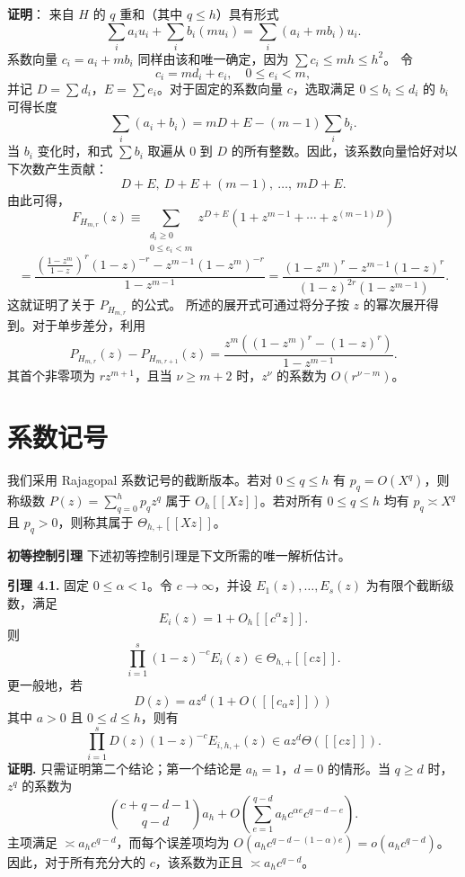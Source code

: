 \documentclass[11pt]{article}
\theoremstyle{break}
\begin{document}
\textbf{证明}：
来自 $H$ 的 $q$ 重和（其中 $q \leq h$）具有形式
\[ \sum_i a_i u_i + \sum_i b_i (m u_i) = \sum_i (a_i + m b_i) u_i. \]
系数向量 $c_i = a_i + m b_i$ 同样由该和唯一确定，因为 $\sum c_i \leq mh \leq h^2$。
令
\[ c_i = m d_i + e_i, \quad 0 \leq e_i < m, \]
并记 $D = \sum d_i$，$E = \sum e_i$。对于固定的系数向量 $c$，选取满足 $0 \leq b_i \leq d_i$ 的 $b_i$ 可得长度
\[ \sum_i (a_i + b_i) = mD + E - (m-1) \sum_i b_i. \]
当 $b_i$ 变化时，和式 $\sum b_i$ 取遍从 $0$ 到 $D$ 的所有整数。因此，该系数向量恰好对以下次数产生贡献：
\[ D+E, \ D+E+(m-1), \ \dots, \ mD+E. \]
由此可得，
\[ F_{H_{m,r}}(z) \equiv \sum_{\substack{d_i \geq 0 \\ 0 \leq e_i < m}} z^{D+E} \left( 1 + z^{m-1} + \cdots + z^{(m-1)D} \right) \]
\[ = \frac{ \left( \frac{1-z^m}{1-z} \right)^r (1-z)^{-r} - z^{m-1}(1-z^m)^{-r} }{ 1-z^{m-1} } = \frac{ (1-z^m)^r - z^{m-1}(1-z)^r }{ (1-z)^{2r}(1-z^{m-1}) }. \]
这就证明了关于 $P_{H_{m,r}}$ 的公式。
所述的展开式可通过将分子按 $z$ 的幂次展开得到。对于单步差分，利用
\[ P_{H_{m,r}}(z) - P_{H_{m,r+1}}(z) = \frac{ z^m \left( (1-z^m)^r - (1-z)^r \right) }{ 1-z^{m-1} }. \]
其首个非零项为 $r z^{m+1}$，且当 $\nu \geq m+2$ 时，$z^\nu$ 的系数为 $O(r^{\nu-m})$。
\section{系数记号}
我们采用 Rajagopal 系数记号的截断版本。若对 $0 \le q \le h$ 有 $p_q = O(X^q)$，则称级数 $P(z) = \sum_{q=0}^h p_q z^q$ 属于 $O_h[[Xz]]$。若对所有 $0 \le q \le h$ 均有 $p_q \asymp X^q$ 且 $p_q > 0$，则称其属于 $\Theta_{h,+}[[Xz]]$。

\textbf{初等控制引理}
下述初等控制引理是下文所需的唯一解析估计。

\textbf{引理 4.1.}
固定 $0 \le \alpha < 1$。令 $c \to \infty$，并设 $E_1(z), \dots, E_s(z)$ 为有限个截断级数，满足
\[ E_i(z) = 1 + O_h[[c^\alpha z]]. \]
则
\[ \prod_{i=1}^s (1-z)^{-c} E_i(z) \in \Theta_{h,+}[[c z]]. \]
更一般地，若
\[ D(z) = a z^d \left(1 + O([[c_\alpha z]])\right) \]
其中 $a > 0$ 且 $0 \le d \le h$，则有
\[ \prod_{i=1}^s D(z)(1-z)^{-c} E_{i, h, +}(z) \in a z^d \Theta([[c z]]). \]
\noindent\textbf{证明.} 只需证明第二个结论；第一个结论是 $a_h = 1$，$d = 0$ 的情形。当 $q \geq d$ 时，$z^q$ 的系数为
\[
\binom{c+q-d-1}{q-d} a_h + O\left( \sum_{e=1}^{q-d} a_h c^{\alpha e} c^{q-d-e} \right).
\]
主项满足 $\asymp a_h c^{q-d}$，而每个误差项均为 $O(a_h c^{q-d-(1-\alpha)e}) = o(a_h c^{q-d})$。因此，对于所有充分大的 $c$，该系数为正且 $\asymp a_h c^{q-d}$。
\end{document}
